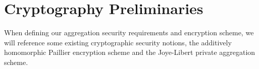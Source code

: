 \documentclass[twocolumn]{autart}
\begin{document}
% 
%                                                                                                        
%                                                                                                        
%                                                                                                        
% 

\section{Cryptography Preliminaries} \label{sec:crypto_prelim}
When defining our aggregation security requirements and encryption scheme, we will reference some existing cryptographic security notions, the additively homomorphic Paillier encryption scheme and the Joye-Libert private aggregation scheme.

% 
% 
\end{document}

